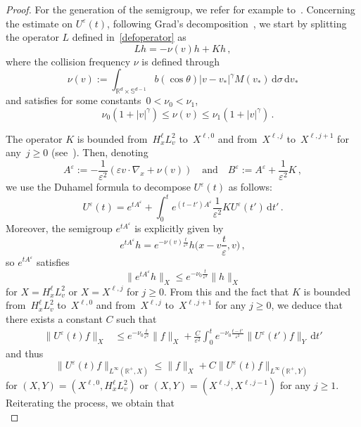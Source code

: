 \documentclass[11pt]{article}
\theoremstyle{definition}
\numberwithin{equation}{section}
\numberwithin{figure}{section}
\numberwithin{table}{section}
\newcommand*{\dd}{\mathrm{d}}
\newcommand*{\dt}{\dd t}
\newcommand*{\dv}{\dd v}
\newcommand*{\dsigma}{\dd \sigma}
\newcommand*\R {\mathbb{R}}
\newcommand*\Sp {\mathbb{S}}
\newcommand*\eps{{\varepsilon}}
\newcommand*\e{{\varepsilon}}
\begin{document}
\begin{proof}
For the generation of the semigroup, we refer for example to~\cite{Glassey, Ukai}. Concerning the estimate on $U^\eps(t)$, following Grad's decomposition~\cite{Grad}, we start by splitting the operator $L$ defined in~\eqref{defoperator} as
\[
L h= -\nu(v) h + Kh \,,
\]
where the collision frequency $\nu$ is defined through \begin{equation}\label{defnu(v)}
\nu(v) := \int_{\R^d \times \Sp^{d-1} } b(\cos \theta) |v-v_*|^\gamma M(v_*)\, \dsigma \, \dv_*
\end{equation}
and satisfies for some constants~$0<\nu_0<\nu_1$,
\[
\quad \nu_0(1+|v|^\gamma) \leq \nu (v) \leq \nu_1(1+|v|^\gamma) \,.
\]

The operator $K$ is bounded from~$H^\ell_x L^2_v$ to~$X^{\ell,0}$ and from~$X^{\ell,j}$ to~$X^{\ell,j+1}$ for any~$j \ge 0$ (see~\cite{Ukai}). Then, denoting
\[
A^\e:=-\frac{1}{\e^2} \left(\e v \cdot \nabla_x + \nu(v)\right) \quad \text{and} \quad B^\e:=A^\e + \frac{1}{\e^2} K\,,
\]
we use the Duhamel formula to decompose $U^\e(t)$ as follows:
\begin{equation}\label{eq:decompUeps}
U^\e(t)=e^{tA^\e} + \int_0^t e^{(t-t')A^\e} \frac{1}{\e^2} K U^\e(t') \, \dt'\,.
\end{equation}
Moreover, the semigroup $e^{tA^\e}$ is explicitly given by
\begin{equation}\label{semigroupAeps}
e^{tA^\e} h = e^{-\nu(v)\frac{t}{\e^2}} h\bigg(x-v\frac{t}{\e},v\bigg)\,,
\end{equation}
so $e^{tA^\e}$ satisfies
\[
\|e^{tA^\e} h\|_X \le e^{-\nu_0\frac{t}{\e^2}} \|h\|_X
\]
for $X=H^\ell_x L^2_v$ or $X=X^{\ell,j}$ for $j \ge 0$. From this and the fact that $K$ is bounded from~$H^\ell_x L^2_v$ to~$X^{\ell,0}$ and from~$X^{\ell,j}$ to~$X^{\ell,j+1}$ for any $j \ge 0$, we deduce that there exists a constant $C$ such that
\begin{align*}
\|U^\e(t)f\|_{X} &\le e^{-\nu_0{\frac{t}{\eps^2}}} \|f\|_X + \frac{C}{\eps^2}\int_0^t e^{-\nu_0 \frac{t-t'}{\eps^2}} \|U^\e(t') f\|_Y \, \dt'
\end{align*}
and thus
\begin{equation}\label{estimateUepsreferee}
\|U^\e(t)f\|_{L^\infty(\R^+,X)}\le \|f\|_X + C \|U^\e(t) f\|_{L^\infty(\R^+,Y)}
\end{equation}
for $(X,Y)=(X^{\ell,0},H^\ell_xL^2_v)$ or $(X,Y)=(X^{\ell,j},X^{\ell,j-1})$ for any $j \ge 1$. Reiterating the process, we obtain that
\begin{equation}\label{reiter}

\end{equation}
\end{proof}
\end{document}
